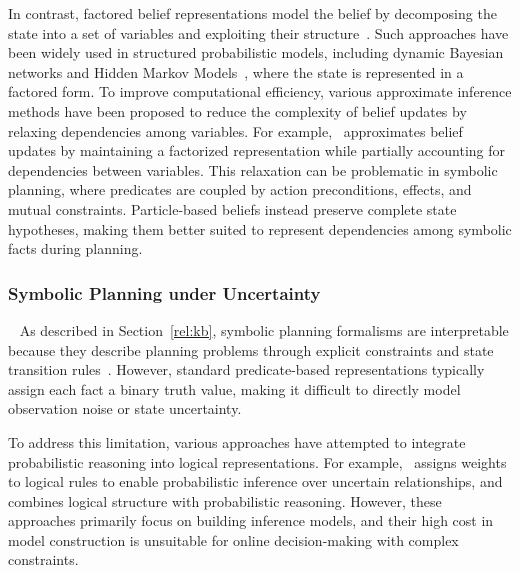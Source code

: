 In contrast, factored belief representations model the belief by decomposing the state into a set of variables and exploiting their structure~\cite{hansen2000dynamic, feng2001approximate, veiga2014point}. Such approaches have been widely used in structured probabilistic models, including dynamic Bayesian networks and Hidden Markov Models~\cite{eddy1996hidden}, where the state is represented in a factored form. To improve computational efficiency, various approximate inference methods have been proposed to reduce the complexity of belief updates by relaxing dependencies among variables. For example,~\cite{murphy2013factored} approximates belief updates by maintaining a factorized representation while partially accounting for dependencies between variables. This relaxation can be problematic in symbolic planning, where predicates are coupled by action preconditions, effects, and mutual constraints. Particle-based beliefs instead preserve complete state hypotheses, making them better suited to represent dependencies among symbolic facts during planning.


\subsubsection{Symbolic Planning under Uncertainty}~\label{rel:pu_sym}
As described in Section~\ref{rel:kb}, symbolic planning formalisms are interpretable because they describe planning problems through explicit constraints and state transition rules~\cite{ghallab2016automated,lifschitz2019answer}. However, standard predicate-based representations typically assign each fact a binary truth value, making it difficult to directly model observation noise or state uncertainty.

To address this limitation, various approaches have attempted to integrate probabilistic reasoning into logical representations. For example,~\cite{richardson2006markov} assigns weights to logical rules to enable probabilistic inference over uncertain relationships, and~\cite{qu2019probabilistic} combines logical structure with probabilistic reasoning. However, these approaches primarily focus on building inference models, and their high cost in model construction is unsuitable for online decision-making with complex constraints. 


